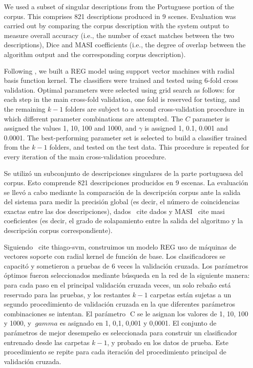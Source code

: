We used a subset of singular descriptions from the Portuguese portion of the corpus. This comprises  821 descriptions produced in 9 scenes. Evaluation was carried out by comparing the corpus description with the system output to measure overall accuracy (i.e., the number of exact matches between the two descriptions), Dice \cite{dice} and MASI \cite{masi} coefficients (i.e., the degree of overlap between the algorithm output and the corresponding corpus description).

Following \cite{thiago-svm}, we built a REG model using support vector machines with radial basis function kernel. The classifiers were trained and tested using 6-fold cross validation. Optimal parameters were selected using grid search as follows: for each step in the main cross-fold validation, one fold is reserved for testing, and the remaining $k-1$ folders are subject  to a second cross-validation procedure in which different parameter combinations are attempted. The $C$ parameter is assigned the values 1, 10, 100 and 1000, and $\gamma$ is assigned 1, 0.1, 0.001 and 0.0001. The best-performing parameter set is selected to build a classifier trained from the $k-1$ folders, and tested on the test data. This procedure is repeated for every iteration of the main cross-validation procedure.

Se utiliz\'o un subconjunto de descripciones singulares de la parte portuguesa del corpus. Esto comprende 821 descripciones producidos en 9 escenas. La evaluaci\'on se llev\'o a cabo mediante la comparaci\'on de la descripci\'on corpus ante la salida del sistema para medir la precisi\'on global (es decir, el n\'umero de coincidencias exactas entre las dos descripciones), dados \ cite {} dados y MASI \ cite {} masi coeficientes (es decir, el grado de solapamiento entre la salida del algoritmo y la descripci\'on corpus correspondiente).

Siguiendo \ cite {thiago-svm}, construimos un modelo REG uso de m\'aquinas de vectores soporte con radial kernel de funci\'on de base. Los clasificadores se capacit\'o y sometieron a pruebas de 6 veces la validaci\'on cruzada. Los par\'ametros \'optimos fueron seleccionados mediante b\'usqueda en la red de la siguiente manera: para cada paso en el principal validaci\'on cruzada veces, un solo reba\~no est\'a reservado para las pruebas, y los restantes $ k-1 $ carpetas est\'an sujetas a un segundo procedimiento de validaci\'on cruzada en la que diferentes par\'ametros combinaciones se intentan. El par\'ametro $ $ C se le asignan los valores de 1, 10, 100 y 1000, y $ \ gamma $ es asignado en 1, 0,1, 0,001 y 0,0001. El conjunto de par\'ametros de mejor desempe\~no es seleccionada para construir un clasificador entrenado desde las carpetas $ k-1 $, y probado en los datos de prueba. Este procedimiento se repite para cada iteraci\'on del procedimiento principal de validaci\'on cruzada.
